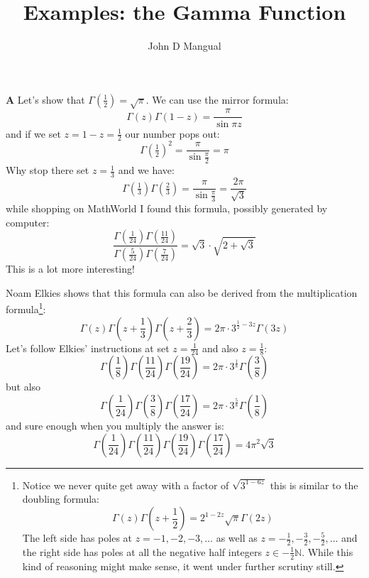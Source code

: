 \documentclass[12pt]{article}
\title{\textbf{ Examples: the Gamma Function }}
\author{John D Mangual}
\date{}
\begin{document}
\selectfont \fontsize{25}{30}\selectfont

\maketitle

\noindent \textbf{A} Let's show that $\Gamma(\frac{1}{2}) = \sqrt{\pi}$.  We can use the mirror formula:
$$ \Gamma(z) \Gamma(1-z) = \frac{\pi}{\sin \pi z} $$
and if we set $z = 1 - z = \frac{1}{2}$ our number pops out:
$$ \Gamma\left(\tfrac{1}{2}\right)^2 = \frac{\pi}{\sin \frac{\pi}{2}} = \pi $$
Why stop there set $z = \frac{1}{3}$ and we have:
$$ \Gamma(\tfrac{1}{3}) \Gamma(\tfrac{2}{3})
= \frac{\pi}{\sin \frac{\pi}{3}} = \frac{2\pi}{\sqrt{3}}$$
while shopping on MathWorld I found this formula, possibly generated by computer:
$$\frac{\Gamma(\frac{1}{24})\Gamma(\frac{11}{24})}{\Gamma(\frac{5}{24})\Gamma(\frac{7}{24})} = \sqrt{3}\cdot  \sqrt{2 + \sqrt{3}} $$
This is a lot more interesting!

\newpage

\noindent Noam Elkies shows that this formula can also be derived from the multiplication formula\footnote{Notice we never quite get away with a factor of $\sqrt{3^{1-6z}}$ this is similar to the doubling formula:
$$ \Gamma(z) \Gamma(z + \frac{1}{2}) = 2^{1-2z} \sqrt{\pi}\Gamma(2z)$$
The left side has poles at $z = -1, -2, -3, \dots$ as well as $z = -\frac{1}{2},  -\frac{3}{2},  -\frac{5}{2}, \dots$ and the right side has poles at all the negative half integers $z \in - \frac{1}{2}\mathbb{N}$.  While this kind of reasoning might make sense, it went under further scrutiny still.}:
$$ \Gamma(z)  \Gamma(z + \frac{1}{3}) 
 \Gamma(z + \frac{2}{3})
 = 2\pi \cdot 3^{\frac{1}{2} - 3z} \Gamma(3z)
$$
Let's follow Elkies' instructions at set $z = \frac{1}{24}$ and also $z = \frac{1}{8}$:
$$ \Gamma(\frac{1}{8})
\Gamma(\frac{11}{24}) \Gamma(\frac{19}{24})
= 2\pi \cdot 3^{\frac{1}{8}} \Gamma(\frac{3}{8})$$
but also
$$ \Gamma(\frac{1}{24})
\Gamma(\frac{3}{8}) \Gamma(\frac{17}{24})
= 2\pi \cdot 3^{\frac{5}{8}} \Gamma(\frac{1}{8})$$
and sure enough when you multiply the answer is:
$$ 
\Gamma(\frac{ 1}{24})
\Gamma(\frac{11}{24}) 
\Gamma(\frac{19}{24})
\Gamma(\frac{17}{24})
 = 4\pi^2 \sqrt{3}
$$

\newpage
\end{document}
